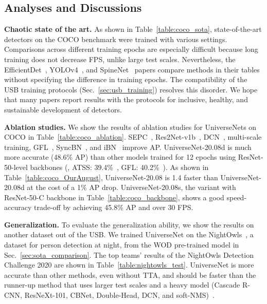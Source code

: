 \documentclass[10pt,twocolumn,letterpaper]{article}
\newcommand{\Univs}{UniverseNets\xspace}
\newcommand{\OurOrig}{UniverseNet\xspace}
\newcommand{\OurAugustD}{UniverseNet-20.08d\xspace}
\newcommand{\OurAugust}{UniverseNet-20.08\xspace}
\newcommand{\OurAugustS}{UniverseNet-20.08s\xspace}
\begin{document}
\subsection{Analyses and Discussions}
\label{sec:analyses}


\textbf{Chaotic state of the art.}
As shown in Table~\ref{table:coco_sota},
state-of-the-art detectors on the COCO benchmark were trained with various settings.
Comparisons across different training epochs are especially difficult
because long training does not decrease FPS, unlike large test scales.
Nevertheless, the EfficientDet~\cite{EfficientDet_CVPR2020}, YOLOv4~\cite{YOLOv4_2020}, and SpineNet~\cite{SpineNet_CVPR2020} papers
compare methods in their tables without specifying the difference in training epochs.
The compatibility of the USB training protocols (Sec.~\ref{sec:usb_training}) resolves this disorder.
We hope that many papers report results with the protocols for inclusive, healthy, and sustainable development of detectors.


\textbf{Ablation studies.}
We show the results of ablation studies for \Univs on COCO in Table~\ref{table:coco_ablation}.
SEPC~\cite{SEPC_CVPR2020}, Res2Net-v1b~\cite{Res2Net_TPAMI2020, Res2Net_PretrainedModels}, DCN~\cite{DCN_ICCV2017}, multi-scale training, GFL~\cite{GFL_NeurIPS2020}, SyncBN~\cite{MegDet_CVPR2018}, and iBN~\cite{SEPC_CVPR2020}
improve AP.
\OurAugustD is much more accurate (48.6\% AP) than other models trained for 12 epochs using ResNet-50-level backbones (\eg, ATSS: 39.4\%~\cite{ATSS_CVPR2020, MMDetection}, GFL: 40.2\%~\cite{GFL_NeurIPS2020, MMDetection}).
As shown in Table~\ref{table:coco_OurAugust},
\OurAugust is 1.4 faster than \OurAugustD at the cost of a 1\% AP drop.
\OurAugustS, the variant with ResNet-50-C backbone in Table~\ref{table:coco_backbone}, shows a good speed-accuracy trade-off by achieving 45.8\% AP and over 30 FPS.

\textbf{Generalization.}
To evaluate the generalization ability, we show the results on another dataset out of the USB.
We trained \OurOrig on the NightOwls~\cite{NightowlsDataset_ACCV2018},
a dataset for person detection at night,
from the WOD pre-trained model in Sec.~\ref{sec:sota_comparison}.
The top teams' results of the NightOwls Detection Challenge 2020 are shown in Table~\ref{table:nightowls_test}.
\OurOrig is more accurate than other methods, even without TTA,
and should be faster than the runner-up method
that uses larger test scales and a heavy model (Cascade R-CNN, ResNeXt-101, CBNet, Double-Head, DCN, and soft-NMS)~\nightowlstalks.
\end{document}
